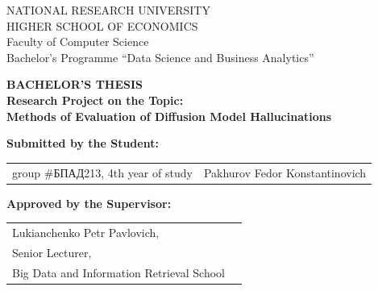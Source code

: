 \begin{titlepage}

\begin{center}
NATIONAL RESEARCH UNIVERSITY\\
HIGHER SCHOOL OF ECONOMICS
\\
\bigskip
Faculty of Computer Science\\
Bachelor’s Programme “Data Science and Business Analytics”
\end{center}


\vspace{7em}

\begin{center}
{\bf BACHELOR'S THESIS}\\
{\bf Research Project on the Topic:}\\
{\bf Methods of Evaluation of Diffusion Model Hallucinations}\\
\end{center}

\vspace{2em}

{\bf Submitted by the Student: \vspace{2mm}}

\begin{tabular}{l@{\hskip 1.5cm}l}
group \#\foreignlanguage{russian}{БПАД}213, 4th year of study & 
Pakhurov Fedor Konstantinovich
\end{tabular}


\vspace{1em}
{\bf Approved by the Supervisor: \vspace{2mm}}

\begin{tabular}{l@{\hskip 1.5cm}l}
Lukianchenko Petr Pavlovich, \\
Senior Lecturer, \\
Big Data and Information Retrieval School \\ 
\end{tabular}


\end{titlepage}

